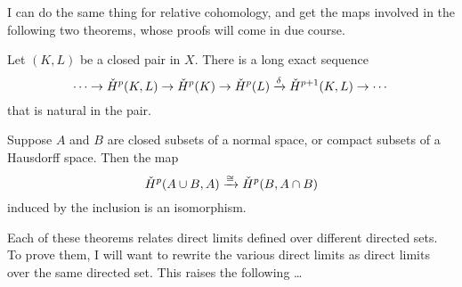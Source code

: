I can do the same thing for relative cohomology, and get the maps
involved in the following two theorems, whose proofs will come in due course.
\begin{theorem}
\label{cech-les}
Let $(K,L)$ be a closed pair in $X$. There is a long exact sequence
\begin{equation*}
\cdots\to\check{H}^p(K,L)\to\check{H}^p(K)\to\check{H}^p(L)\xrightarrow{\delta}\check{H}^{p+1}(K,L)\to\cdots
\end{equation*}
that is natural in the pair. 
\end{theorem}
\begin{theorem}[Excision]
\label{cech-excision}
Suppose $A$ and $B$ are closed subsets of a normal space, 
or compact subsets of a Hausdorff space.  
Then the map
\[
\check{H}^p(A\cup B,A)\xrightarrow{\cong}\check{H}^p(B,A\cap B)
\] 
induced by the inclusion is an isomorphism.
\end{theorem}

Each of these theorems relates direct limits defined over different directed 
sets. To prove them, I will want to rewrite the various direct limits
as direct limits over the same directed set. This raises the following \ldots

